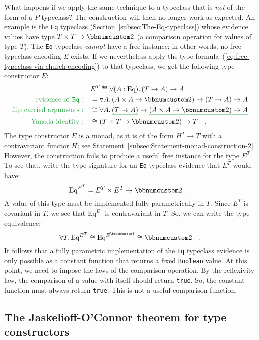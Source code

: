 What happens if we apply the same technique to a typeclass that is
\emph{not} of the form of a $P$-typeclass? The construction will
then no longer work as expected. An example is the \lstinline!Eq!
typeclass (Section~\ref{subsec:The-Eq-typeclass}) whose evidence
values have type $T\times T\rightarrow\bbnum 2$ (a comparison operation
for values of type $T$). The \lstinline!Eq! typeclass \emph{cannot}
have a free instance; in other words, no free typeclass encoding $E$
exists. If we nevertheless apply the type formula~(\ref{eq:free-typeclass-via-church-encoding})
to that typeclass, we get the following type constructor $E$:
\begin{align*}
 & E^{T}\triangleq\forall(A:\text{Eq}).\,(T\rightarrow A)\rightarrow A\\
{\color{greenunder}\text{evidence of \texttt{Eq}}:}\quad & =\forall A.\,(A\times A\rightarrow\bbnum 2)\rightarrow(T\rightarrow A)\rightarrow A\\
{\color{greenunder}\text{flip curried arguments}:}\quad & \cong\forall A.\,\gunderline{(T\rightarrow A)}\rightarrow\gunderline{(A\times A\rightarrow\bbnum 2)\rightarrow A}\\
{\color{greenunder}\text{Yoneda identity}:}\quad & \cong(T\times T\rightarrow\bbnum 2)\rightarrow T\quad.
\end{align*}
The type constructor $E$ is a monad, as it is of the form $H^{T}\rightarrow T$
with a contravariant functor $H$; see Statement~\ref{subsec:Statement-monad-construction-2}.
However, the construction fails to produce a useful free instance
for the type $E^{T}$. To see that, write the type signature for an
\lstinline!Eq! typeclass evidence that $E^{T}$ would have:
\[
\text{Eq}^{E^{T}}=E^{T}\times E^{T}\rightarrow\bbnum 2\quad.
\]
A value of this type must be implemented fully parametrically in $T$.
Since $E^{T}$ is covariant in $T$, we see that $\text{Eq}^{E^{T}}$
is contravariant in $T$. So, we can write the type equivalence:
\[
\forall T.\,\text{Eq}^{E^{T}}\cong\text{Eq}^{E^{\bbnum 1}}\cong\bbnum 2\quad.
\]
It follows that a fully parametric implementation of the \lstinline!Eq!
typeclass evidence is only possible as a constant function that returns
a fixed \lstinline!Boolean! value. At this point, we need to impose
the laws of the comparison operation. By the reflexivity law,
the comparison of a value with itself should return \lstinline!true!.
So, the constant function must always return \lstinline!true!. This
is not a useful comparison function.

\subsection{The Jaskelioff-O\textsf{'}Connor theorem for type constructors}

